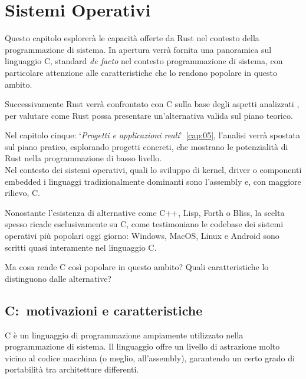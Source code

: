 
\chapter{Sistemi Operativi}\label{cap:04}

Questo capitolo esplorerà le capacità offerte da Rust nel 
contesto della programmazione di sistema. In apertura verrà
fornita una panoramica sul linguaggio C, standard \textit{de facto}
nel contesto programmazione di sistema, con particolare attenzione alle 
 caratteristiche che lo rendono popolare in questo ambito.

Successivamente Rust verrà confrontato con C sulla base degli aspetti analizzati
, per valutare come Rust possa presentare un'alternativa valida sul piano teorico.

Nel capitolo cinque: `\textit{Progetti e applicazioni reali}'~\ref{cap:05}, l'analisi verrà spostata sul piano pratico, 
esplorando progetti concreti, che mostrano le potenzialità di Rust nella programmazione di basso livello. \hfill
\vspace{20pt}\\
\noindent Nel contesto dei sistemi operativi, quali lo sviluppo di kernel, driver o componenti embedded i linguaggi tradizionalmente dominanti
 sono l'assembly e, con maggiore rilievo, C.

Nonostante l'esistenza di alternative come C++, Lisp, Forth o Bliss, la scelta spesso ricade esclusivamente
su C, come testimoniano le codebase dei sistemi operativi più popolari oggi giorno: Windows, MacOS, Linux e Android sono scritti quasi interamente nel linguaggio C.

Ma cosa rende C così popolare in questo ambito? Quali caratteristiche lo distinguono dalle alternative?

\section{C:\  motivazioni e caratteristiche}
C è un linguaggio di programmazione ampiamente utilizzato nella 
programmazione di sistema. Il linguaggio offre un livello
di astrazione molto vicino al codice macchina (o meglio, 
all'assembly), garantendo un certo grado di portabilità 
tra architetture differenti.

